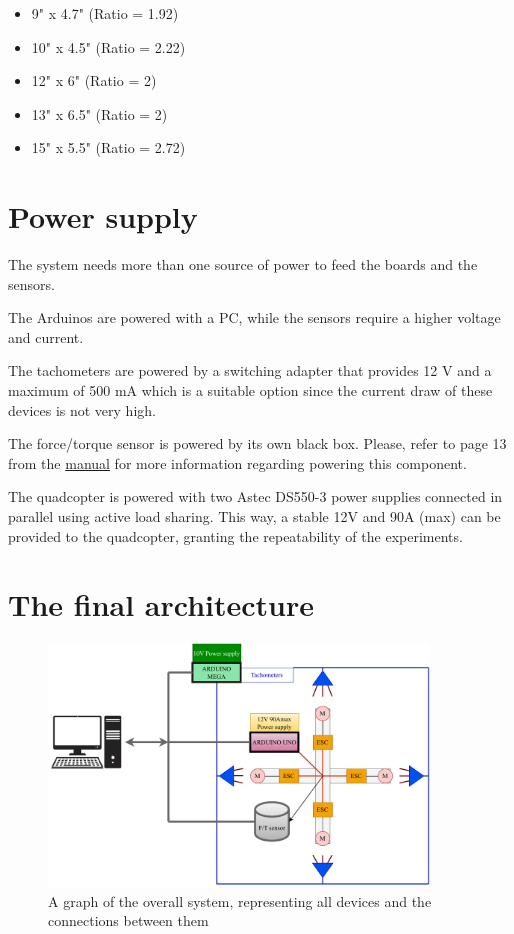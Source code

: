 \documentclass[a4paper]{article}
\begin{document}
{\begin{itemize}
	\item 9" x 4.7" (Ratio = 1.92)
	\item 10" x 4.5" (Ratio = 2.22)
	\item 12" x 6" (Ratio = 2)
	\item 13" x 6.5" (Ratio = 2)
	\item 15" x 5.5" (Ratio = 2.72)
\end{itemize}




\section{Power supply}

The system needs more than one source of power to feed the boards and the sensors. 

The Arduinos are powered with a PC, while the sensors require a higher voltage and current.

The tachometers are powered by a switching adapter that provides 12 V and a maximum of 500 mA which is a suitable option since the current draw of these devices is not very high.

The force/torque sensor is powered by its own black box. Please, refer to page 13 from the \hyperref{https://www.ati-ia.com/app_content/documents/9620-05-DAQ.pdf}{category}{name}{manual} for more information regarding powering this component.

The quadcopter is powered with two Astec DS550-3 power supplies connected in parallel using active load sharing. This way, a stable 12V and 90A (max) can be provided to the quadcopter, granting the repeatability of the experiments.

\section{The final architecture}

\begin{figure}[h!]
	\centering
	\includegraphics[width=0.9\textwidth]{General_setup.pdf}
	\caption{A graph of the overall system, representing all devices and the connections between them}
	\label{fig:overall_system}
\end{figure}

}
\end{document}
